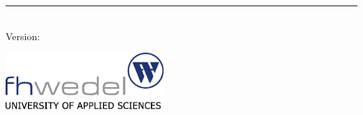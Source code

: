 \begin{titlepage}
	\flushright
	\hfill
	\vfill
	{\LARGE\thesisTitle \par}
	\rule[5pt]{\textwidth}{.4pt} \par
	{\Large\thesisAuthor}
	\vfill
	\textit{\large\thesisDate} \\
	Version: \thesisVersion
\end{titlepage}


\begin{titlepage}
	\tgherosfont
	\centering

	\includegraphics[width=6cm]{gfx/fhw} \\

	\vfill
	{\LARGE \color{ctcolortitle}\textbf{\thesisTitle} \\[10mm]}
	{\Large \thesisSubtitle} \\


\end{titlepage}
